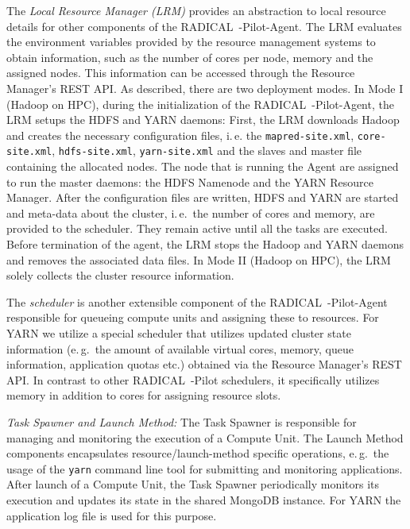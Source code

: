 The \emph{Local Resource Manager (LRM)} provides an abstraction to local resource details for other components of the RADICAL~-Pilot-Agent.
The LRM evaluates the environment variables provided by the resource management systems to obtain information, such as the number of cores per node, memory and the assigned nodes.
This information can be accessed through the Resource Manager's REST API.
As described, there are two deployment modes.
In Mode I (Hadoop on HPC), during the initialization of the RADICAL~-Pilot-Agent, the LRM setups the HDFS and YARN daemons: 
First, the LRM downloads Hadoop and creates the necessary configuration files, i.\,e. the \texttt{mapred-site.xml}, \texttt{core-site.xml}, \texttt{hdfs-site.xml}, \texttt{yarn-site.xml} and the slaves and master file containing the allocated nodes.
The node that is running the Agent are assigned to run the master daemons: the HDFS Namenode and the YARN Resource Manager.
After the configuration files are written, HDFS and YARN are started and meta-data about the cluster, i.\,e.\ the number of cores and memory, are provided to the scheduler.
They remain active until all the tasks are executed.
Before termination of the agent, the LRM stops the Hadoop and YARN daemons and removes the associated data files.
In Mode II (Hadoop on HPC), the LRM solely collects the cluster resource information.

The \emph{scheduler} is another extensible component of the RADICAL~-Pilot-Agent responsible for queueing compute units and assigning these to resources.
For YARN we utilize a special scheduler that utilizes updated cluster state information (e.\,g.\ the amount of available virtual cores, memory, queue information, application quotas etc.) obtained via the Resource Manager's REST API.
In contrast to other RADICAL~-Pilot schedulers, it specifically utilizes memory in addition to cores for assigning resource slots.

\emph{Task Spawner and Launch Method:}
The Task Spawner is responsible for managing and monitoring the execution of a Compute Unit.
The Launch Method components encapsulates resource/launch-method specific operations, e.\,g.\ the usage of the \texttt{yarn} command line tool for submitting and monitoring applications.
After launch of a Compute Unit, the Task Spawner periodically monitors its execution and updates its state in the shared MongoDB instance.
For YARN the application log file is used for this purpose.

